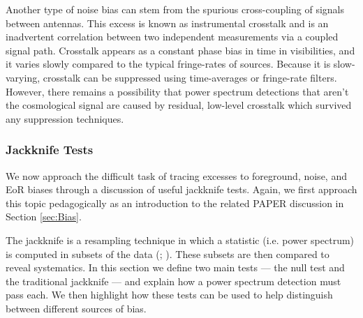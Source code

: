 \documentclass[preprint2,numberedappendix,tighten]{aastex6}  %
\begin{document}
Another type of noise bias can stem from the spurious cross-coupling of signals between antennas. This excess is known as 
instrumental crosstalk and is an inadvertent correlation between two independent measurements via a coupled signal path. 
Crosstalk appears as a constant phase bias in time in visibilities, and it varies slowly compared to the typical fringe-rates of 
sources. Because it is slow-varying, crosstalk can be suppressed using time-averages or fringe-rate filters. However, there 
remains a possibility that power spectrum detections that aren't the cosmological signal are caused by residual, low-level crosstalk which survived any 
suppression techniques. 

\subsubsection{Jackknife Tests}
\label{sec:JackknifeOverview}

We now approach the difficult task of tracing excesses to foreground, noise, and EoR biases through a discussion of useful 
jackknife tests. Again, we first approach this topic pedagogically as an introduction to the related PAPER discussion in Section 
\ref{sec:Bias}. 

The jackknife is a resampling technique in which a statistic (i.e. power spectrum) is computed in subsets of the data (\citealt{quenouille1949}; \citealt{tukey1958}). These 
subsets are then compared to reveal systematics. In this section we define two main tests --- the null test and the traditional 
jackknife --- and explain how a power spectrum detection must pass each. We then highlight how these tests can be used to 
help distinguish between different sources of bias.
 
\end{document}
